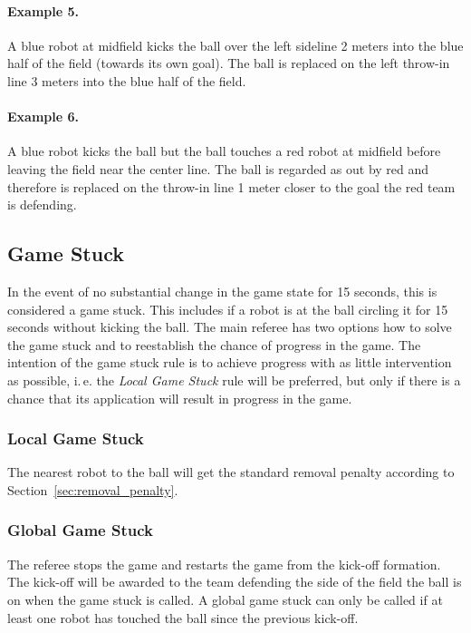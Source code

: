 \documentclass[12pt]{article}
\newcommand{\ie}{\mbox{i.\,e.}\xspace}
\begin{document}
\paragraph{Example 5.} A blue robot at midfield kicks the ball over the left sideline 2 meters into the blue half of the field (towards its own goal). The ball is replaced on the left throw-in line 3 meters into the blue half of the field.

\paragraph{Example 6.} A blue robot kicks the ball but the ball touches a red robot at midfield before leaving the field near the center line. The ball is regarded as out by red and therefore is replaced on the throw-in line 1 meter closer to the goal the red team is defending.


\subsection{Game Stuck}
\label{sec:game_stuck}

In the event of no substantial change in the game state for 15 seconds, this is considered a game stuck. 
This includes if a robot is at the ball circling it for 15 seconds without kicking the ball.
The main referee has two options how to solve the game stuck and to reestablish the chance of progress in the game. The intention of the game stuck rule is to achieve progress with as little intervention as possible, \ie the \emph{Local Game Stuck} rule will be preferred, but only if there is a chance that its application will result in progress in the game.

\subsubsection{Local Game Stuck}
\label{sec:game_stuck:local}

The nearest robot to the ball will get the standard removal penalty according to Section~\ref{sec:removal_penalty}.

\subsubsection{Global Game Stuck}
\label{sec:game_stuck:global}

The referee stops the game and restarts the game from the kick-off formation. The kick-off will be awarded to the team defending the side of the field the ball is on when the game stuck is called. A global game stuck can only be called if at least one robot has touched the ball since the previous kick-off.
\end{document}
